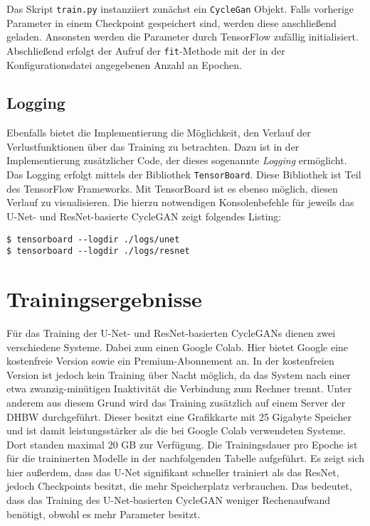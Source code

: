 Das Skript \texttt{train.py} instanziiert zunächst ein \texttt{CycleGan} Objekt. Falls vorherige Parameter in einem Checkpoint gespeichert sind, werden diese anschließend geladen. Ansonsten werden die Parameter durch TensorFlow zufällig initialisiert. Abschließend erfolgt der Aufruf der \texttt{fit}-Methode mit der in der Konfigurationsdatei angegebenen Anzahl an Epochen.

\subsection{Logging}
Ebenfalls bietet die Implementierung die Möglichkeit, den Verlauf der Verlustfunktionen über das Training zu betrachten. Dazu ist in der Implementierung zusätzlicher Code, der dieses sogenannte \emph{Logging} ermöglicht. Das Logging erfolgt mittels der Bibliothek \texttt{TensorBoard}. Diese Bibliothek ist Teil des TensorFlow Frameworks. Mit TensorBoard ist es ebenso möglich, diesen Verlauf zu visualisieren. Die hierzu notwendigen Konsolenbefehle für jeweils das U-Net- und ResNet-basierte \ac{CycleGAN} zeigt folgendes Listing:
\begin{code}
   \begin{verbatim}
$ tensorboard --logdir ./logs/unet
$ tensorboard --logdir ./logs/resnet
   \end{verbatim}
\end{code}

\section{Trainingsergebnisse}
\label{chap:trainingsergebnisse}
Für das Training der U-Net- und ResNet-basierten \acp{CycleGAN} dienen zwei verschiedene Systeme. Dabei zum einen Google Colab. Hier bietet Google eine kostenfreie Version sowie ein Premium-Abonnement an. In der kostenfreien Version ist jedoch kein Training über Nacht möglich, da das System nach einer etwa zwanzig-minütigen Inaktivität die Verbindung zum Rechner trennt. Unter anderem aus diesem Grund wird das Training zusätzlich auf einem Server der DHBW durchgeführt. Dieser besitzt eine Grafikkarte mit 25 Gigabyte Speicher und ist damit leistungsstärker als die bei Google Colab verwendeten Systeme. Dort standen maximal 20 GB zur Verfügung. Die Trainingsdauer pro Epoche ist für die traininerten Modelle in der nachfolgenden Tabelle aufgeführt. Es zeigt sich hier außerdem, dass das U-Net signifikant schneller trainiert als das ResNet, jedoch Checkpoints besitzt, die mehr Speicherplatz verbrauchen. Das bedeutet, dass das Training des U-Net-basierten \ac{CycleGAN} weniger Rechenaufwand benötigt, obwohl es mehr Parameter besitzt.

